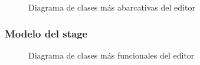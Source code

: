 \documentclass[a4paper]{article}
\begin{document}
\begin{figure}[!h]
\caption{Diagrama de clases más abarcativas del editor}
\label{fig:diagrama5}
\end{figure}

\newpage
\subsubsection{Modelo del stage}

\begin{figure}[!h]
\caption{Diagrama de clases más funcionales del editor}
\label{fig:diagrama6}
\end{figure}
\end{document}

